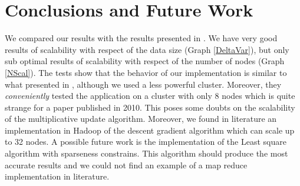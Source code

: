\section{Conclusions and Future Work}
\label{conclusion}
%
%
%
%
%

We compared our results with the results presented in \cite{liu2010}.
We have very good results of scalability with respect of the data size (Graph \ref{DeltaVar}), but only sub optimal results of scalability with respect of the number of nodes (Graph \ref{NScal}).
The tests show that the behavior of our implementation is similar to what presented in \citep{liu2010}, although we used a less powerful cluster.
Moreover, they \textit{conveniently} tested the application on a cluster with only 8 nodes which is quite strange for a paper published in 2010.
This poses some doubts on the scalability of the multiplicative update algorithm.
Moreover, we found in literature an implementation in Hadoop of the descent gradient algorithm\cite{IBM_NMF} which can scale up to 32 nodes.
A possible future work is the implementation of the Least square algorithm with sparseness constrains.
This algorithm should produce the most accurate results and we could not find an example of a map reduce implementation in literature.

